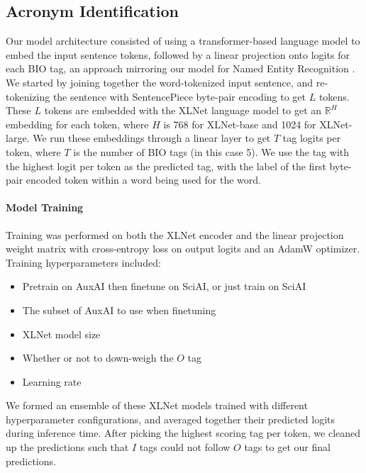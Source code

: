 \documentclass[letterpaper]{article} %
\begin{document}
\subsection{Acronym Identification}
Our model architecture consisted of using a transformer-based language model \cite{transformer} to embed the input sentence tokens, followed by a linear projection onto logits for each BIO tag, an approach mirroring our model for Named Entity Recognition \cite{ner}. We started by joining together the word-tokenized input sentence, and re-tokenizing the sentence with SentencePiece byte-pair encoding \cite{kudo-richardson-2018-sentencepiece} to get $L$ tokens. These $L$ tokens are embedded with the XLNet language model \cite{Yang2019XLNetGA} to get an $\mathbb{R}^H$ embedding for each token, where $H$ is 768 for XLNet-base and 1024 for XLNet-large. We run these embeddings through a linear layer to get $T$ tag logits per token, where $T$ is the number of BIO tags (in this case 5). We use the tag with the highest logit per token as the predicted tag, with the label of the first byte-pair encoded token within a word being used for the word.

\paragraph*{Model Training} Training was performed on both the XLNet encoder and the linear projection weight matrix with cross-entropy loss on output logits and an AdamW optimizer. Training hyperparameters included:
\begin{itemize}
    \item Pretrain on AuxAI then finetune on SciAI, or just train on SciAI
    \item The subset of AuxAI to use when finetuning
    \item XLNet model size
    \item Whether or not to down-weigh the $O$ tag
    \item Learning rate
\end{itemize}
We formed an ensemble of these XLNet models trained with different hyperparameter configurations, and averaged together their predicted logits during inference time. After picking the highest scoring tag per token, we cleaned up the predictions such that $I$ tags could not follow $O$ tags to get our final predictions.
\end{document}
